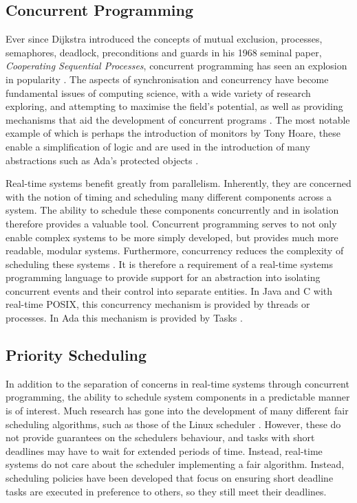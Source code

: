 \subsection{Concurrent Programming}
Ever since Dijkstra introduced the concepts of mutual exclusion, processes,
semaphores, deadlock, preconditions and guards in his 1968 seminal paper,
\emph{Cooperating Sequential Processes}, concurrent programming has seen an
explosion in popularity \cite{Dijkstra}.  The aspects of synchronisation and
concurrency have become fundamental issues of computing science, with a wide
variety of research exploring, and attempting to maximise the field's
potential, as well as providing mechanisms that aid the development of
concurrent programs
\cite{Sutter:2005:SCR:1095408.1095421,Hansen:1972:SM:361454.361473}.  The most
notable example of which is perhaps the introduction of monitors by Tony Hoare,
these enable a simplification of logic and are used in the introduction of many
abstractions such as Ada's protected objects
\cite{Hoare:1974:MOS:355620.361161}.  
\par\bigskip\noindent
Real-time systems benefit greatly from parallelism. Inherently, they are
concerned with the notion of timing and scheduling many different components
across a system.  The ability to schedule these components concurrently and in
isolation therefore provides a valuable tool. Concurrent programming serves to
not only enable complex systems to be more simply developed, but provides much
more readable, modular systems. Furthermore, concurrency reduces the complexity
of scheduling these systems \cite{real-time-systems}.  It is therefore a
requirement of a real-time systems programming language to provide support for
an abstraction into isolating concurrent events and their control into separate
entities.  In Java and C with real-time POSIX, this concurrency mechanism is
provided by threads or processes. In Ada this mechanism is provided by Tasks
\cite[p251]{gehani1989concurrent}.

\subsection{Priority Scheduling}
In addition to the separation of concerns in real-time systems through
concurrent programming, the ability to schedule system components in a
predictable manner is of interest.  Much research has gone into the development
of many different fair scheduling algorithms, such as those of the Linux
scheduler \cite{6043273,7280991}. However, these do not provide guarantees on
the schedulers behaviour, and tasks with short deadlines may have to wait for
extended periods of time. Instead, real-time systems do not care about the
scheduler implementing a fair algorithm. Instead, scheduling policies have been
developed that focus on ensuring short deadline tasks are executed in
preference to others, so they still meet their deadlines. 

